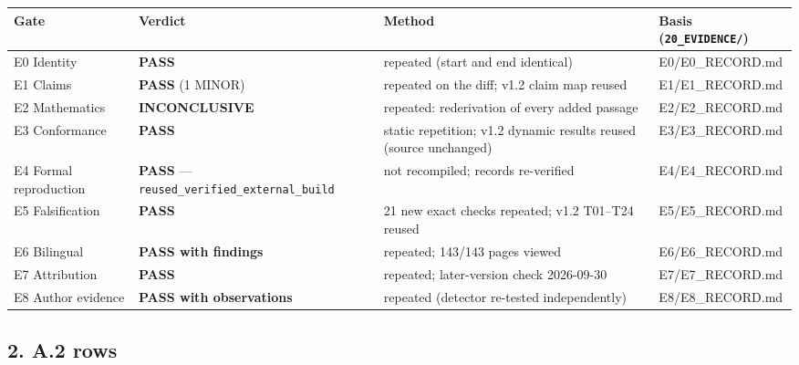 \documentclass[
]{article}
\newcounter{none} %
\begin{document}
{\def\LTcaptype{none} %
\begin{longtable}[]{@{}llll@{}}
\toprule\noalign{}
Gate & Verdict & Method & Basis (\texttt{20\_EVIDENCE/}) \\
\midrule\noalign{}
\endhead
\bottomrule\noalign{}
\endlastfoot
E0 Identity & \textbf{PASS} & repeated (start and end identical) &
E0/E0\_RECORD.md \\
E1 Claims & \textbf{PASS} (1 MINOR) & repeated on the diff; v1.2 claim
map reused & E1/E1\_RECORD.md \\
E2 Mathematics & \textbf{INCONCLUSIVE} & repeated: rederivation of every
added passage & E2/E2\_RECORD.md \\
E3 Conformance & \textbf{PASS} & static repetition; v1.2 dynamic results
reused (source unchanged) & E3/E3\_RECORD.md \\
E4 Formal reproduction & \textbf{PASS} ---
\texttt{reused\_verified\_external\_build} & not recompiled; records
re-verified & E4/E4\_RECORD.md \\
E5 Falsification & \textbf{PASS} & 21 new exact checks repeated; v1.2
T01--T24 reused & E5/E5\_RECORD.md \\
E6 Bilingual & \textbf{PASS with findings} & repeated; 143/143 pages
viewed & E6/E6\_RECORD.md \\
E7 Attribution & \textbf{PASS} & repeated; later-version check
2026-09-30 & E7/E7\_RECORD.md \\
E8 Author evidence & \textbf{PASS with observations} & repeated
(detector re-tested independently) & E8/E8\_RECORD.md \\
\end{longtable}
}

\subsection{2. A.2 rows}\label{2-a2-rows}
\end{document}

